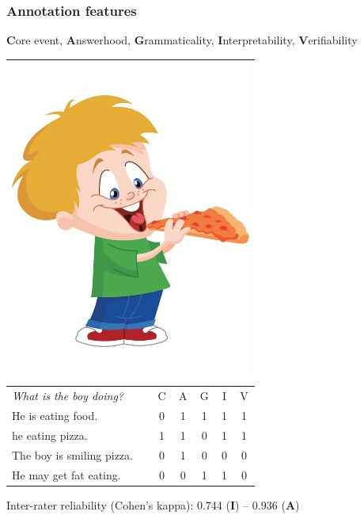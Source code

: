\documentclass[handout,xcolor={dvipsnames}]{beamer}
\begin{document}
\begin{frame}
\frametitle{Annotation features}
\begin{table}[htb!]
\small
\textbf{C}ore event, \textbf{A}nswerhood, \textbf{G}rammaticality, \textbf{I}nterpretability, \textbf{V}erifiability \\

\vspace{.3em}
\begin{center}
\begin{tabular}{|l|c|c|c|c|c|}
\hline
\multicolumn{6}{|c|}{\includegraphics[width=0.25\columnwidth]{figures/I02.jpg}} \\
\hline
\textit{What is the boy doing?} & C & A & G & I & V \\
\hline
\hline
He is eating food. & 0 & 1 & 1 & 1 & 1 \\
\hline
he eating pizza. & 1 & 1 & 0 & 1 & 1 \\
\hline
The boy is smiling pizza. & 0 & 1 & 0 & 0 & 0 \\
\hline
He may get fat eating. & 0 & 0 & 1 & 1 & 0 \\
\hline
\end{tabular}
\end{center}
\end{table}
\vspace{.3em}

Inter-rater reliability (Cohen's kappa): 0.744 (\textbf{I}) -- 0.936 (\textbf{A}) \\

\end{frame}
\end{document}
